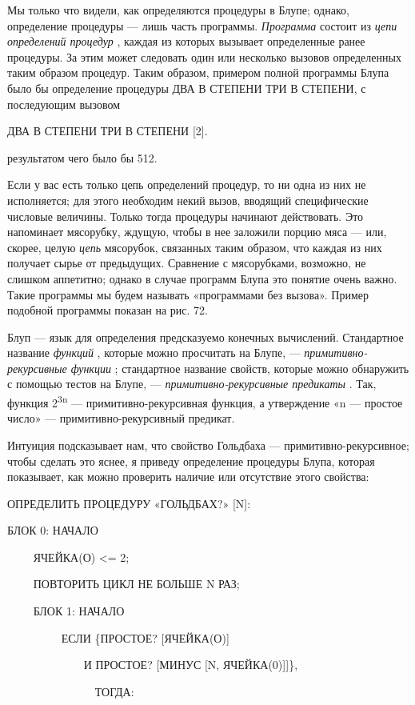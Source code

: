 \documentclass[../main.tex]{subfiles}
\begin{document}
Мы только что видели, как определяются процедуры в Блупе; однако, определение процедуры --- лишь часть программы. \emph{Программа} состоит из \emph{цепи определений процедур} , каждая из которых вызывает определенные ранее процедуры. За этим может следовать один или несколько вызовов определенных таким образом процедур. Таким образом, примером полной программы Блупа было бы определение процедуры ДВА В СТЕПЕНИ ТРИ В СТЕПЕНИ, с последующим вызовом

ДВА В СТЕПЕНИ ТРИ В СТЕПЕНИ {[}2{]}.

результатом чего было бы 512.

Если у вас есть только цепь определений процедур, то ни одна из них не исполняется; для этого необходим некий вызов, вводящий специфические числовые величины. Только тогда процедуры начинают действовать. Это напоминает мясорубку, ждущую, чтобы в нее заложили порцию мяса --- или, скорее, целую \emph{цепь} мясорубок, связанных таким образом, что каждая из них получает сырье от предыдущих. Сравнение с мясорубками, возможно, не слишком аппетитно; однако в случае программ Блупа это понятие очень важно. Такие программы мы будем называть «программами без вызова». Пример подобной программы показан на рис. 72.

Блуп --- язык для определения предсказуемо конечных вычислений. Стандартное название \emph{функций} , которые можно просчитать на Блупе, --- \emph{примитивно-рекурсивные функции} ; стандартное название свойств, которые можно обнаружить с помощью тестов на Блупе, --- \emph{примитивно-рекурсивные предикаты} . Так, функция 2\textsuperscript{3n} --- примитивно-рекурсивная функция, а утверждение «n --- простое число» --- примитивно-рекурсивный предикат.

Интуиция подсказывает нам, что свойство Гольдбаха --- примитивно-рекурсивное; чтобы сделать это яснее, я приведу определение процедуры Блупа, которая показывает, как можно проверить наличие или отсутствие этого свойства:

ОПРЕДЕЛИТЬ ПРОЦЕДУРУ «ГОЛЬДБАХ?» {[}N{]}:

БЛОК 0: НАЧАЛО

~~~~ ЯЧЕЙКА(О) \textless= 2;

~~~~ ПОВТОРИТЬ ЦИКЛ НЕ БОЛЬШЕ N РАЗ;

~~~~ БЛОК 1: НАЧАЛО

~~~~~~~~~ ЕСЛИ \{ПРОСТОЕ? {[}ЯЧЕЙКА(О){]}

~~~~~~~~~~~~~ И ПРОСТОЕ? {[}МИНУС {[}N, ЯЧЕЙКА(0){]}{]}\},

~~~~~~~~~~~~~~~ ТОГДА:
\end{document}
